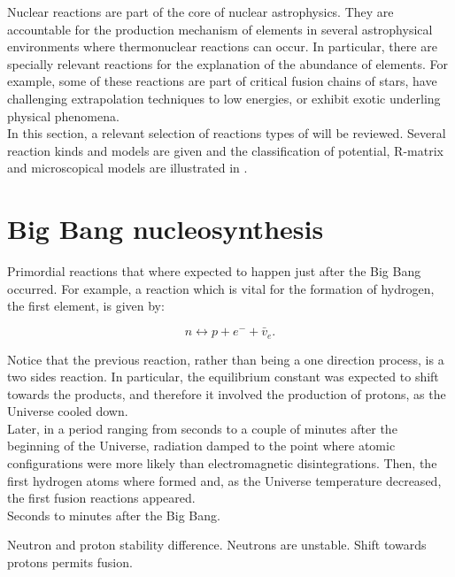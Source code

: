 \documentclass[openany]{book}
\begin{document}
Nuclear reactions are part of the core of nuclear astrophysics. They are accountable for the production mechanism of elements in several astrophysical environments where thermonuclear reactions can occur. In particular, there are specially relevant reactions for the explanation of the abundance of elements. For example, some of these reactions are part of critical fusion chains of stars, have challenging extrapolation techniques to low energies, or  exhibit exotic underling physical phenomena.   \\

In this section, a relevant selection of reactions types of will be reviewed.  Several reaction kinds and models are given and the classification of potential, R-matrix and microscopical models are illustrated in \cite{descouvemont_2020}.



\section{Big Bang nucleosynthesis} \label{sec:BBN}

Primordial reactions that where expected to happen just after the Big Bang occurred. For example, a reaction which is vital for the formation of hydrogen, the first element, is given by: 

\begin{equation} \label{eq:reaction_BBN_np}
	n \leftrightarrow p + e^{-} + \bar v_{e}. 
\end{equation}

Notice that the previous reaction, rather than being a one direction process, is a two sides reaction. In particular, the equilibrium constant was expected to shift towards the products, and therefore it involved the production of protons, as the Universe cooled down. \\

Later, in a period ranging from seconds to a couple of minutes after the beginning of the Universe, radiation damped to the point where atomic configurations were more likely than electromagnetic disintegrations. Then, the first hydrogen atoms where formed and, as the Universe temperature decreased, the first fusion reactions appeared.  \\

Seconds to minutes after the Big Bang. 

Neutron and proton stability difference. Neutrons are unstable.  Shift towards protons permits fusion. 
\end{document}
